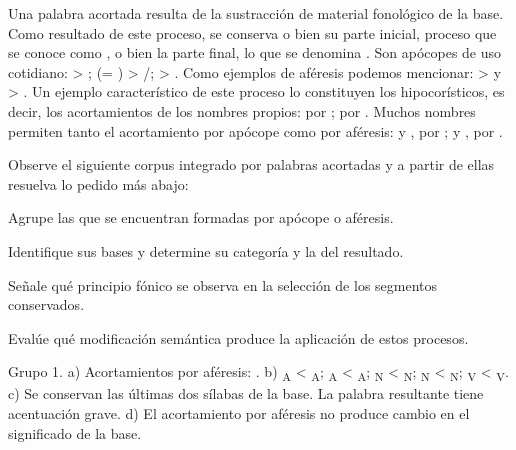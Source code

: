 Una palabra acortada resulta de la sustracción de material fonológico de la
base. Como resultado de este proceso, se conserva o bien su parte inicial,
proceso que se conoce como , o bien la parte final, lo que se
denomina . Son apócopes de uso cotidiano:  >
;  (= ) > /;
 > . Como ejemplos de aféresis podemos mencionar:
 >  y  > . Un ejemplo
característico de este proceso lo constituyen los hipocorísticos, es decir, los
acortamientos de los nombres propios:  por ;
 por . Muchos nombres permiten tanto el
acortamiento por apócope como por aféresis:  y , por
;  y , por .

\begin{ejercicio}\label{ej:04-acortamiento}
Observe el siguiente corpus integrado por palabras acortadas y a partir de ellas
resuelva lo pedido más abajo:


\begin{consignas}
  \item Agrupe las que se encuentran formadas por apócope o aféresis.
  \item Identifique sus bases y determine su categoría y la del resultado.
  \item Señale qué principio fónico se observa en la selección de los segmentos
        conservados.
  \item Evalúe qué modificación semántica produce la aplicación de estos
        procesos.
\end{consignas}

\begin{resuelto}
Grupo 1. a) Acortamientos por aféresis: . b) \textsubscript{A} < \textsubscript{A};
\textsubscript{A} < \textsubscript{A};
\textsubscript{N} < \textsubscript{N};
\textsubscript{N} < \textsubscript{N};
\textsubscript{V} < \textsubscript{V}. c) Se
conservan las últimas dos sílabas de la base. La palabra resultante tiene
acentuación grave. d) El acortamiento por aféresis no produce cambio en el
significado de la base.
\end{resuelto}
\end{ejercicio}

